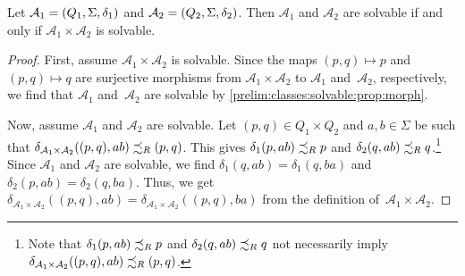 \begin{proposition}\label{prelim:subclasses:prop:solvable-product}
	Let $\mathcal A_1 = (Q_1, \Sigma, \delta_1)$ and 
	$\mathcal A_2 = (Q_2, \Sigma, \delta_2)$.
	Then $\mathcal A_1$ and $\mathcal A_2$ are solvable
	if and only if $\mathcal A_1 \times \mathcal A_2$ is solvable.
\end{proposition}
\begin{proof}
	First, assume $\mathcal A_1 \times \mathcal A_2$ is solvable.
	Since the maps $(p,q) \mapsto p$
	and $(p,q) \mapsto q$
	are surjective morphisms from $\mathcal A_1 \times \mathcal A_2$
	to $\mathcal A_1$ and~$\mathcal A_2$, respectively,
	we find that $\mathcal A_1$
	and~$\mathcal A_2$ are solvable by \cref{prelim:classes:solvable:prop:morph}. 
	
	Now, assume $\mathcal A_1$ and $\mathcal A_2$
	are solvable. 
	Let $(p,q) \in Q_1 \times Q_2$ and $a,b \in \Sigma$
	be such that $\delta_{\mathcal A_1 \times \mathcal A_2}((p,q), ab) \precsim_R (p,q)$.
	This gives $\delta_1(p, ab) \precsim_R p$
	and $\delta_2(q, ab) \precsim_R q$.\footnote{Note that
		$\delta_1(p, ab) \precsim_R p$
		and $\delta_2(q, ab) \precsim_R q$
		not necessarily imply $\delta_{\mathcal A_1 \times \mathcal A_2}((p,q), ab) \precsim_R (p,q)$.}
	Since $\mathcal A_1$ and $\mathcal A_2$ are solvable,
	we find $\delta_1(q, ab) = \delta_1(q, ba)$
	and $\delta_2(p, ab) = \delta_2(q, ba)$.
	Thus, 
	we get $\delta_{\mathcal A_1 \times \mathcal A_2}((p,q), ab) = \delta_{\mathcal A_1 \times \mathcal A_2}((p,q), ba)$
	from the definition of~$\mathcal A_1 \times \mathcal A_2$.
\end{proof}

